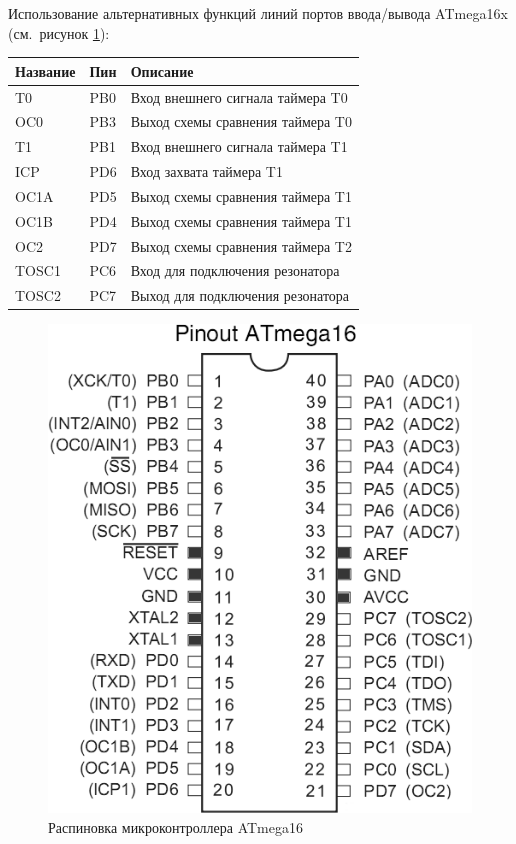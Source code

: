 \documentclass[main.tex]{subfiles}
\begin{document}

Использование альтернативных функций линий портов ввода/вывода ATmega16x (см.~рисунок \ref{fig:pins}):

    \begin{tabular}{|l|l|l|}
    \hline
    Название & Пин & Описание\\
    \hline
    T0 & PB0 & Вход внешнего сигнала таймера T0\\
    OC0 & PB3 & Выход схемы сравнения таймера T0\\
    \hline
    T1 & PB1 & Вход внешнего сигнала таймера T1\\
    ICP & PD6 & Вход захвата таймера T1\\
    OC1A & PD5 & Выход схемы сравнения таймера T1\\
    OC1B & PD4 & Выход схемы сравнения таймера T1\\
    \hline
    OC2 & PD7 & Выход схемы сравнения таймера T2\\
    \hline
    TOSC1 & PC6 & Вход для подключения резонатора\\
    TOSC2 & PC7 & Выход для подключения резонатора\\
    \hline
    \end{tabular}

\begin{figure}[h]
\centering
\includegraphics[scale=0.25]{images/3_pins.png}
\caption{Распиновка микроконтроллера ATmega16}
\label{fig:pins}
\end{figure}
\end{document}
